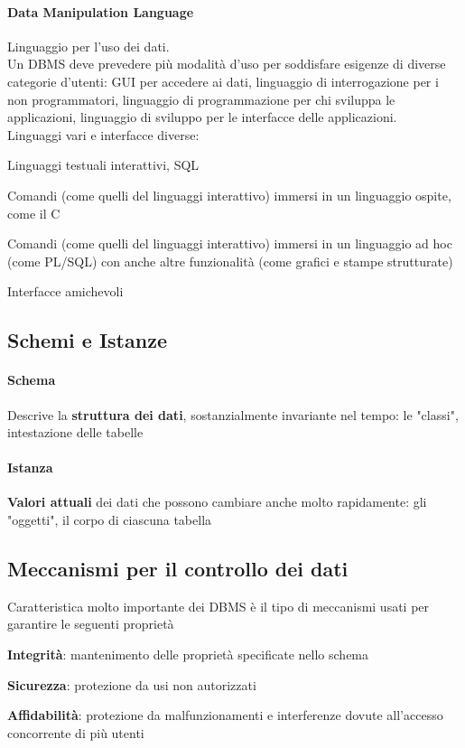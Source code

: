\documentclass[10pt]{book}
\begin{document}
\paragraph{Data Manipulation Language} Linguaggio per l'uso dei dati.\\
Un DBMS deve prevedere più modalità d'uso per soddisfare esigenze di diverse categorie d'utenti: GUI per accedere ai dati, linguaggio di interrogazione per i non programmatori, linguaggio di programmazione per chi sviluppa le applicazioni, linguaggio di sviluppo per le interfacce delle applicazioni.\\
Linguaggi vari e interfacce diverse:
\begin{list}{}{}
	\item Linguaggi testuali interattivi, SQL
	\item Comandi (come quelli del linguaggi interattivo) immersi in un linguaggio ospite, come il C
	\item Comandi (come quelli del linguaggi interattivo) immersi in un linguaggio ad hoc (come PL/SQL) con anche altre funzionalità (come grafici e stampe strutturate)
	\item Interfacce amichevoli
\end{list}
\subsection{Schemi e Istanze}
\paragraph{Schema} Descrive la \textbf{struttura dei dati}, sostanzialmente invariante nel tempo: le "classi", intestazione delle tabelle
\paragraph{Istanza} \textbf{Valori attuali} dei dati che possono cambiare anche molto rapidamente: gli "oggetti", il corpo di ciascuna tabella
\subsection{Meccanismi per il controllo dei dati}
Caratteristica molto importante dei DBMS è il tipo di meccanismi usati per garantire le seguenti proprietà
\begin{list}{}{}
	\item \textbf{Integrità}: mantenimento delle proprietà specificate nello schema
	\item \textbf{Sicurezza}: protezione da usi non autorizzati
	\item \textbf{Affidabilità}: protezione da malfunzionamenti e interferenze dovute all'accesso concorrente di più utenti
\end{list}
\end{document}
